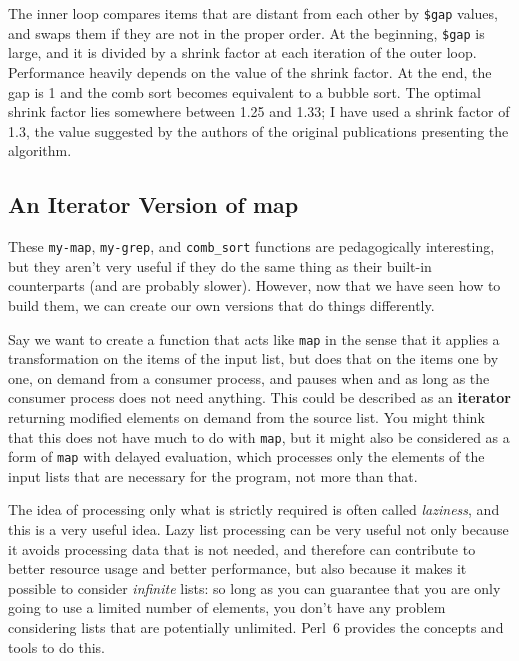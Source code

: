 The inner loop compares items that are distant from each 
other by \verb'$gap' values, and swaps them if they are 
not in the proper order. At the beginning, \verb'$gap' 
is large, and it is divided by a shrink factor at each 
iteration of the outer loop. Performance heavily depends
on the value of the shrink factor. At the end, the gap 
is 1 and the comb sort becomes equivalent to a bubble 
sort. The optimal shrink factor lies somewhere between 1.25 
and 1.33; I have used a shrink factor of 1.3, the value 
suggested by the authors of the original publications 
presenting the algorithm.

	\subsection{An Iterator Version of map}

These {\tt my-map}, {\tt my-grep}, and {\tt comb\_sort} 
functions are pedagogically interesting, but they aren't 
very useful if they do the same thing as their built-in 
counterparts (and are probably slower). However, now 
that we have seen how to build them, we can create our 
own versions that do things differently.

Say we want to create a function that acts like 
{\tt map} in the sense that it applies a 
transformation on the items of the input list, but does 
that on the items one by one, on demand from a consumer 
process, and pauses when and as long as the consumer process 
does not need anything. This could be described as an 
{\bf iterator} returning modified elements on demand from the 
source list. You might think that this does not have much to 
do with {\tt map}, but it might also be considered as 
a form of {\tt map} with delayed evaluation, which 
processes only the elements of the input lists that are 
necessary for the program, not more than that. 

The idea 
of processing only what is strictly required is often called 
\emph{laziness}, and this is a very useful idea. Lazy 
list processing can be very useful not only because it 
avoids processing data that is not needed, and therefore 
can contribute to better resource usage and better 
performance, but also because it makes it possible to consider 
\emph{infinite} lists: so long as you can guarantee that 
you are only going to use a limited number of elements, 
you don't have any problem considering lists that are 
potentially unlimited. Perl~6 provides the concepts and 
tools to do this.

